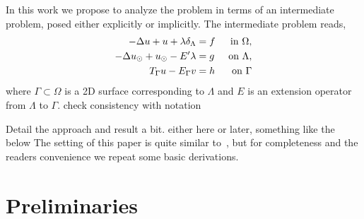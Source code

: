 \documentclass[r]{siamart171218}
\newcommand{\kent}[1]{{\color{blue}#1}}
\begin{document}
In this work we propose to analyze the problem in terms of an intermediate problem, posed either explicitly or implicitly. The intermediate problem reads, 
\begin{subequations}
\label{inteq:pde}
\begin{align}
\label{inteq:pde1}
  -\Delta u + u + \lambda \delta_{\Lambda} &= f &\mbox{ in } \Omega,\\
\label{inteq:pde2}
-\Delta \ud + \ud - E' \lambda  &= g &\mbox{ on } \Lambda,\\
\label{inteq:coupling}
T_\Gamma u - E_\Gamma v  &=  h &\mbox{ on } \Gamma
\end{align}
\end{subequations}
where $\Gamma \subset \Omega$ is a 2D surface corresponding to $\Lambda$
and $E$ is an extension operator from $\Lambda$ to $\Gamma$. 
\kent{check consistency with notation}

Detail the approach and result a bit.
\kent{either here or later, something like the below}
The setting of this paper is quite
similar to~\cite{laurino_m2an}, but for completeness and the readers convenience we repeat some basic derivations. 



\section{Preliminaries}\label{sec:setting}

\end{document}
